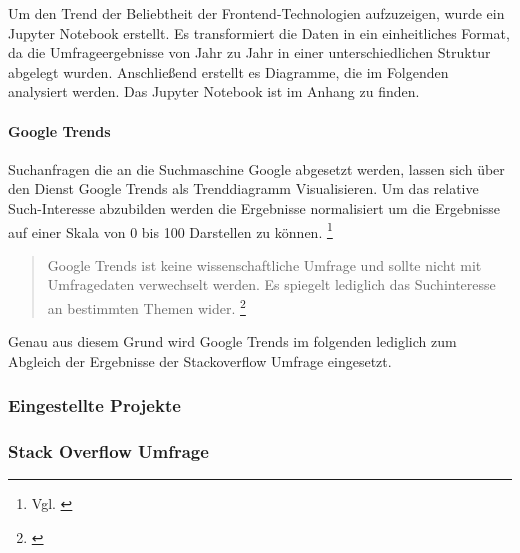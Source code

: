 Um den Trend der Beliebtheit der Frontend-Technologien aufzuzeigen, wurde ein Jupyter Notebook erstellt. Es transformiert die Daten in ein einheitliches Format, da die  Umfrageergebnisse von Jahr zu Jahr in einer unterschiedlichen Struktur abgelegt wurden. Anschließend erstellt es Diagramme, die im Folgenden analysiert werden. Das Jupyter Notebook ist im  Anhang zu finden.

\paragraph{Google Trends} Suchanfragen die an die Suchmaschine Google  abgesetzt werden, lassen sich  über den Dienst Google Trends  als Trenddiagramm Visualisieren. Um das relative Such-Interesse abzubilden werden die Ergebnisse normalisiert um die Ergebnisse auf einer Skala von 0 bis 100 Darstellen zu können. \footnote{Vgl. \cite{GoogleTrendsHilfe}}

\begin{quotation}
Google Trends ist keine wissenschaftliche Umfrage und sollte nicht mit Umfragedaten verwechselt werden. Es spiegelt lediglich das Suchinteresse an bestimmten Themen wider. \footnote{\cite{GoogleTrendsHilfe}}
\end{quotation}

Genau aus diesem Grund wird Google Trends im folgenden lediglich zum Abgleich der Ergebnisse der Stackoverflow Umfrage  eingesetzt.


\subsubsection{Eingestellte Projekte}



\subsubsection{Stack Overflow Umfrage}
